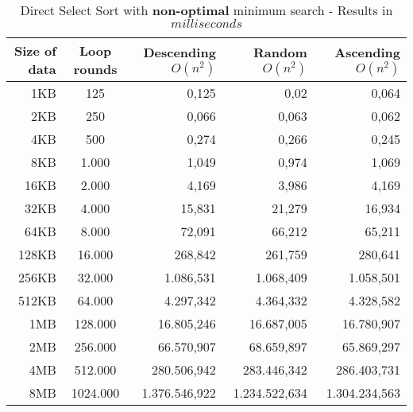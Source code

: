 \documentclass[11pt]{amsart}
\begin{document}
\begin{table}[htdp]
	\caption{Direct Select Sort with \textbf{non-optimal} minimum search - Results in $milliseconds$}
	\begin{tabular}{|r|c|r|r|r|} \hline
		Size of data & Loop rounds & \parbox[c]{3.5cm}{Descending \\ $O(n^2)$} & \parbox[c]{3.5cm}{Random \\$O(n^2)$} & \parbox[c]{3.5cm}{Ascending \\ $O(n^2)$} \\ \hline
		1KB & 125 & 0,125 & 0,02 & 0,064 \\ \hline
		2KB & 250 & 0,066 & 0,063 & 0,062 \\ \hline
		4KB & 500 & 0,274 & 0,266 & 0,245 \\ \hline
		8KB & 1.000 & 1,049 & 0,974 & 1,069 \\ \hline
		16KB & 2.000 & 4,169 & 3,986 & 4,169 \\ \hline
		32KB & 4.000 & 15,831 & 21,279 & 16,934 \\ \hline
		64KB & 8.000 & 72,091 & 66,212 & 65,211 \\ \hline
		128KB & 16.000 & 268,842 & 261,759 & 280,641 \\ \hline
		256KB & 32.000 & 1.086,531 & 1.068,409 & 1.058,501 \\ \hline
		512KB & 64.000 & 4.297,342 & 4.364,332 & 4.328,582 \\ \hline
		1MB & 128.000 & 16.805,246 & 16.687,005 & 16.780,907 \\ \hline
		2MB & 256.000 & 66.570,907 & 68.659,897 & 65.869,297 \\ \hline
		4MB & 512.000 & 280.506,942 & 283.446,342 & 286.403,731 \\ \hline
		8MB & 1024.000 & 1.376.546,922 & 1.234.522,634 & 1.304.234,563 \\ \hline
	\end{tabular}
	\label{default}
\end{table}%
\end{document}
